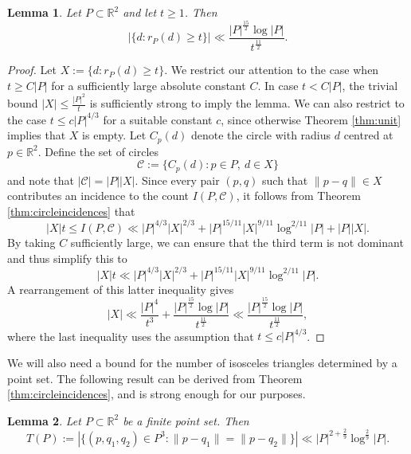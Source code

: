 \documentclass[11pt,oneside]{amsart}
\numberwithin{exercise}{subsection}
\newtheorem{lemma}{Lemma}
\begin{document}
\begin{lemma} \label{lem:richd}
Let $P \subset \mathbb R^2$ and let $t \geq 1$. Then
\[
|\{ d : r_P(d) \geq t \}| \ll \frac{|P|^{\frac{15}{2}}\log|P|}{t^{\frac{11}{2}}}.
\]
\end{lemma}
\begin{proof}
Let $X:= \{ d : r_P(d) \geq t \}$. We restrict our attention to the case when $t\geq C|P|$ for a sufficiently large absolute constant $C$. In case $t < C|P|$, the trivial bound $|X| \leq \frac{|P|^2}{t}$ is sufficiently strong to imply the lemma. We can also restrict to the case $t \leq c|P|^{4/3}$ for a suitable constant $c$, since otherwise Theorem \ref{thm:unit} implies that $X$ is empty. Let $C_p(d)$ denote the circle with radius $d$ centred at $p \in \mathbb R^2$. Define the set of circles
\[
\mathcal C:= \{ C_p(d) : p \in P,\ d \in X \}
\]
and note that $|\mathcal C|=|P||X|$. Since every pair $(p,q)$ such that $\|p-q\| \in X$ contributes an incidence to the count $I(P, \mathcal C)$, it follows from Theorem \ref{thm:circleincidences} that
\[
     |X|t \leq I(P, \mathcal C) \ll |P|^{4/3}|X|^{2/3} + |P|^{15/11}|X|^{9/11} \log^{2/11} |P| + |P||X|.
\]
By taking $C$ sufficiently large, we can ensure that the third term is not dominant and thus simplify this to
\[
    |X|t \ll |P|^{4/3}|X|^{2/3} + |P|^{15/11}|X|^{9/11} \log^{2/11}|P| .
\]
A rearrangement of this latter inequality gives 
\[
|X| \ll \frac{|P|^4}{t^3} + \frac{|P|^{\frac{15}{2}}\log|P|}{t^{\frac{11}{2}}} \ll  \frac{|P|^{\frac{15}{2}}\log|P|}{t^{\frac{11}{2}}},
\]
where the last inequality uses the assumption that $t \leq c|P|^{4/3}$.
\end{proof}
We will also need a bound for the number of isosceles triangles determined by a point set. The following result can be derived from Theorem \ref{thm:circleincidences}, and is strong enough for our purposes.
\begin{lemma} \label{lem:isosceles}
 Let $P \subset \mathbb R^2$ be a finite point set. Then
 \[
 T(P):= |\{(p,q_1,q_2) \in P^3 : \|p-q_1\|=\|p-q_2\| \}| \ll |P|^{2+\frac{2}{9}}\log^{\frac{2}{9}}|P|.
 \]
\end{lemma}
\end{document}
